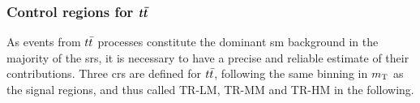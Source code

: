\begin{table}
\begin{center}
\caption{Overview of the CR and VR definitions. With the exception of $\mlb$, which is not used in the definitions of the \glspl{cr} and \glspl{vr}, all regions share the same selection as the \glspl{sr} on the remaining kinematic observables not listed here.} 
\label{tab:CRVRdef}
\end{center}
\end{table}

\subsubsection[Control regions for $\ttbar$]{Control regions for $\makemebold{\ttbar}$}

As events from $\ttbar$ processes constitute the dominant \gls{sm} background in the majority of the \glspl{sr}, it is necessary to have a precise and reliable estimate of their contributions.
Three \glspl{cr} are defined for $\ttbar$, following the same binning in $m_{\textrm{T}}$ as the signal regions, and thus called TR-LM, TR-MM and TR-HM in the following.

